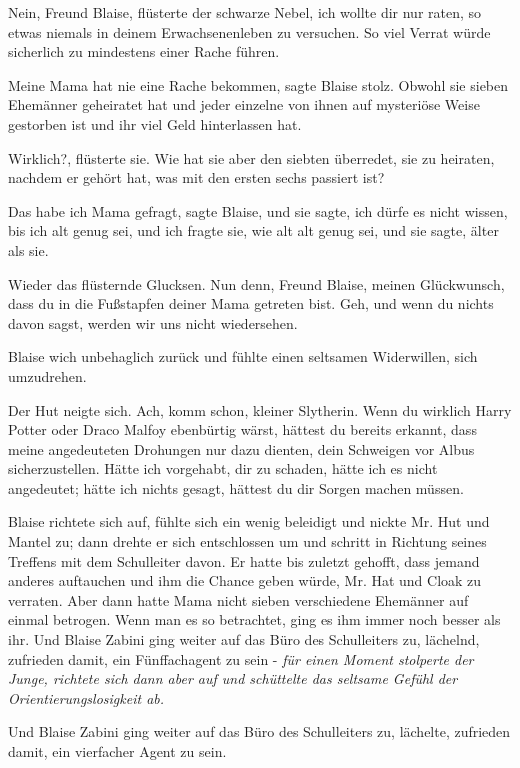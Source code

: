 \glqq{}Nein, Freund Blaise\grqq{}, flüsterte der schwarze Nebel, \glqq{}ich wollte
dir nur raten, so etwas niemals in deinem Erwachsenenleben zu versuchen. So viel
Verrat würde sicherlich zu mindestens einer Rache führen.\grqq{}

\glqq{}Meine Mama hat nie eine Rache bekommen\grqq{}, sagte Blaise stolz. \glqq{}
Obwohl sie sieben Ehemänner geheiratet hat und jeder einzelne von ihnen auf
mysteriöse Weise gestorben ist und ihr viel Geld hinterlassen hat.\grqq{}

\glqq{}Wirklich?\grqq{}, flüsterte sie. \glqq{}Wie hat sie aber den siebten
überredet, sie zu heiraten, nachdem er gehört hat, was mit den ersten sechs
passiert ist?\grqq{}

\glqq{}Das habe ich Mama gefragt\grqq{}, sagte Blaise, \glqq{}und sie sagte, ich
dürfe es nicht wissen, bis ich alt genug sei, und ich fragte sie, wie alt alt
genug sei, und sie sagte, älter als sie.\grqq{}

Wieder das flüsternde Glucksen. \glqq{}Nun denn, Freund Blaise, meinen
Glückwunsch, dass du in die Fußstapfen deiner Mama getreten bist. Geh, und
wenn du nichts davon sagst, werden wir uns nicht wiedersehen.\grqq{}

Blaise wich unbehaglich zurück und fühlte einen seltsamen Widerwillen, sich
umzudrehen.

Der Hut neigte sich. \glqq{}Ach, komm schon, kleiner Slytherin. Wenn du wirklich
Harry Potter oder Draco Malfoy ebenbürtig wärst, hättest du bereits erkannt,
dass meine angedeuteten Drohungen nur dazu dienten, dein Schweigen vor Albus
sicherzustellen. Hätte ich vorgehabt, dir zu schaden, hätte ich es nicht
angedeutet; hätte ich nichts gesagt, hättest du dir Sorgen machen müssen.\grqq{}

Blaise richtete sich auf, fühlte sich ein wenig beleidigt und nickte Mr. Hut und
Mantel zu; dann drehte er sich entschlossen um und schritt in Richtung seines
Treffens mit dem Schulleiter davon. Er hatte bis zuletzt gehofft, dass jemand
anderes auftauchen und ihm die Chance geben würde, Mr. Hat und Cloak zu
verraten. Aber dann hatte Mama nicht sieben verschiedene Ehemänner auf einmal
betrogen. Wenn man es so betrachtet, ging es ihm immer noch besser als ihr. Und
Blaise Zabini ging weiter auf das Büro des Schulleiters zu, lächelnd, zufrieden
damit, ein Fünffachagent zu sein -\emph{ für einen Moment stolperte der Junge,
richtete sich dann aber auf und schüttelte das seltsame Gefühl der
Orientierungslosigkeit ab.}

Und Blaise Zabini ging weiter auf das Büro des Schulleiters zu, lächelte,
zufrieden damit, ein vierfacher Agent zu sein.

